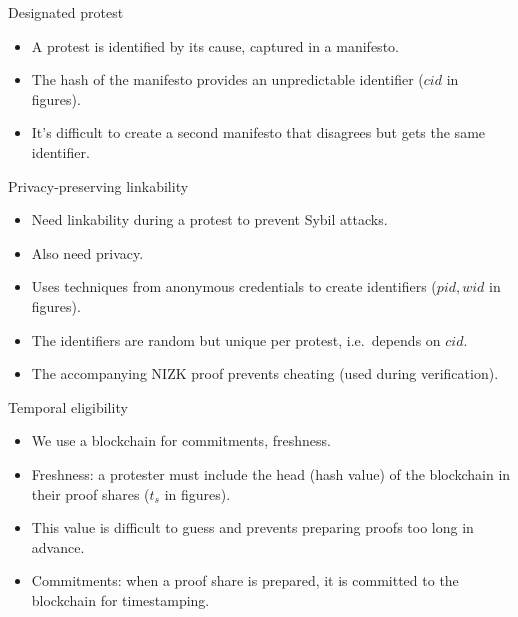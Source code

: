 \begin{columns}[t]
\begin{column}{0.32\linewidth}
    \begin{whiteblock}{Designated protest}
      \begin{itemize}
        \item A protest is identified by its cause, captured in a 
          manifesto.
        \item The hash of the manifesto provides an unpredictable identifier 
          (\(cid\) in figures).
        \item It's difficult to create a second manifesto that disagrees but 
          gets the same identifier.
      \end{itemize}
    \end{whiteblock}

    \begin{whiteblock}{Privacy-preserving linkability}
      \begin{itemize}
        \item Need linkability during a protest to prevent Sybil attacks.
        \item Also need privacy.
        \item Uses techniques from anonymous credentials to create identifiers 
          (\(pid, wid\) in figures).
        \item The identifiers are random but unique per protest, i.e.\ depends 
          on \(cid\).
        \item The accompanying \ac{NIZK} proof prevents cheating (used during 
          verification).
      \end{itemize}
    \end{whiteblock}

    \begin{whiteblock}{Temporal eligibility}
      \begin{itemize}
        \item We use a blockchain for commitments, freshness.
        \item Freshness: a protester must include the head (hash value) of the 
          blockchain in their proof shares (\(t_s\) in figures).
        \item This value is difficult to guess and prevents preparing proofs too 
          long in advance.
        \item Commitments: when a proof share is prepared, it is committed to 
          the blockchain for timestamping.
      \end{itemize}
    \end{whiteblock}


\end{column}
\end{columns}
